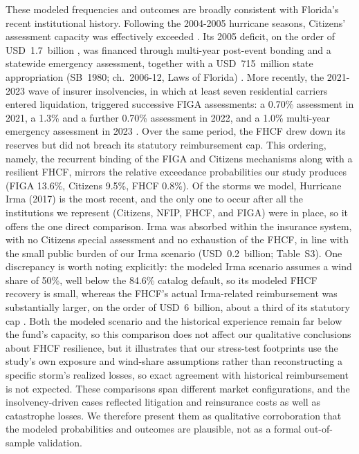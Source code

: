 \documentclass[fleqn,10pt]{wlscirep}
\begin{document}
These modeled frequencies and outcomes are broadly consistent with Florida's recent institutional history. Following the 2004-2005 hurricane seasons, Citizens' assessment capacity was effectively exceeded \cite{kousky_evolution_2024}. Its 2005 deficit, on the order of USD~1.7~billion \cite{flsenate2011citizens}, was financed through multi-year post-event bonding and a statewide emergency assessment, together with a USD~715~million state appropriation (SB~1980; ch.~2006-12, Laws of Florida) \cite{flsb1980_2006}. More recently, the 2021-2023 wave of insurer insolvencies, in which at least seven residential carriers entered liquidation, triggered successive FIGA assessments: a 0.70\% assessment in 2021, a 1.3\% and a further 0.70\% assessment in 2022, and a 1.0\% multi-year emergency assessment in 2023 \cite{figa_assessments}. Over the same period, the FHCF drew down its reserves but did not breach its statutory reimbursement cap. This ordering, namely, the recurrent binding of the FIGA and Citizens mechanisms along with a resilient FHCF, mirrors the relative exceedance probabilities our study produces (FIGA 13.6\%, Citizens 9.5\%, FHCF 0.8\%). Of the storms we model, Hurricane Irma (2017) is the most recent, and the only one to occur after all the institutions we represent (Citizens, NFIP, FHCF, and FIGA) were in place, so it offers the one direct comparison. Irma was absorbed within the insurance system, with no Citizens special assessment and no exhaustion of the FHCF, in line with the small public burden of our Irma scenario (USD~0.2~billion; Table~S3). One discrepancy is worth noting explicitly: the modeled Irma scenario assumes a wind share of 50\%, well below the 84.6\% catalog default, so its modeled FHCF recovery is small, whereas the FHCF's actual Irma-related reimbursement was substantially larger, on the order of USD~6~billion, about a third of its statutory cap \cite{fhcf_annual_report_2023}. Both the modeled scenario and the historical experience remain far below the fund's capacity, so this comparison does not affect our qualitative conclusions about FHCF resilience, but it illustrates that our stress-test footprints use the study's own exposure and wind-share assumptions rather than reconstructing a specific storm's realized losses, so exact agreement with historical reimbursement is not expected. These comparisons span different market configurations, and the insolvency-driven cases reflected litigation and reinsurance costs as well as catastrophe losses. We therefore present them as qualitative corroboration that the modeled probabilities and outcomes are plausible, not as a formal out-of-sample validation. \medskip
\end{document}

